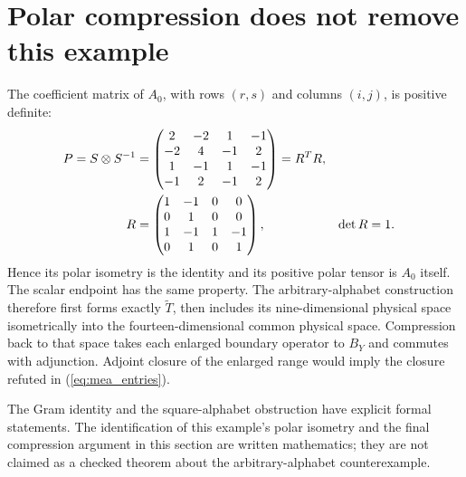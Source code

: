 \documentclass{article}
\begin{document}
\section{Polar compression does not remove this example}
The coefficient matrix of $A_0$, with rows $(r,s)$ and columns $(i,j)$,
is positive definite:
\begin{align}
    P=S\otimes S^{-1}
      & =\begin{pmatrix}
             2 & -2 & 1 & -1 \\-2&4&-1&2\\1&-1&1&-1\\-1&2&-1&2
         \end{pmatrix}=R^TR,\notag \\
    R & =\begin{pmatrix}
             1 & -1 & 0 & 0 \\0&1&0&0\\1&-1&1&-1\\0&1&0&1
         \end{pmatrix},      & \det R & =1.
    \label{eq:mea_polar}
\end{align}
Hence its polar isometry is the identity and its positive polar tensor
is $A_0$ itself. The scalar endpoint has the same property. The
arbitrary-alphabet construction therefore first forms exactly
$\widetilde T$, then includes its nine-dimensional physical space
isometrically into the fourteen-dimensional common physical space.
Compression back to that space takes each enlarged boundary operator
to $B_Y$ and commutes with adjunction. Adjoint closure of the enlarged
range would imply the closure refuted in (\ref{eq:mea_entries}).

The Gram identity and the square-alphabet obstruction have explicit
formal statements. The identification of this example's polar
isometry and the final compression argument in this section are
written mathematics; they are not claimed as a checked theorem about
the arbitrary-alphabet counterexample.
\end{document}
